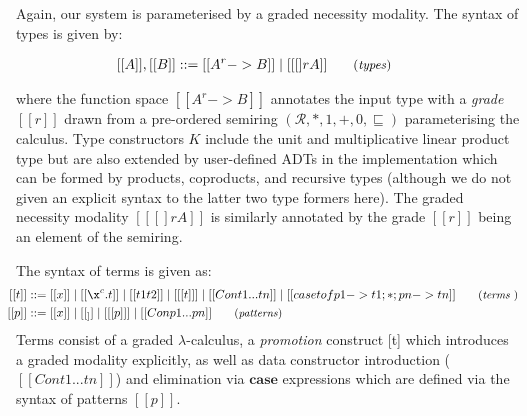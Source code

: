 Again, our system is parameterised by a graded necessity modality. The syntax of types is given by:

\begin{align*}
\hspace{-0.9em}[[ A ]] , [[ B ]] & ::=
       [[ A ^ r -> B ]]
  \mid [[ [] r A ]]
{\small{\tag{\textit{types}}}}
\end{align*}


where the function space $[[ A ^ r -> B ]]$ annotates the input type with a \emph{grade} $[[ r ]]$
drawn from a pre-ordered semiring $(\mathcal{R}, {\ast}, {1}, {+}, {0}, \sqsubseteq)$ parameterising
the calculus. Type constructors $K$ include the unit and multiplicative linear product type but
are also extended by user-defined ADTs in the implementation which can be formed by products, coproducts,
and recursive types (although we do not given an explicit syntax to the latter two type formers here).
The graded necessity modality $[[ [] r A ]]$ is similarly annotated by the grade $[[ r ]]$ being
an element of the semiring. %



The syntax of terms is given as:
%
\begin{align*}
\hspace{-0.8em} [[ t ]] ::= \;
       & [[ x ]]
  \mid [[ \x ^ c . t ]]
  \mid [[ t1 t2 ]]
  \mid [[ [t] ]]
  \mid [[ Con t1 ... tn ]]
  \mid [[ case t of p1 -> t1 ; * ; pn -> tn  ]]
{\small{\tag{\textit{terms} }}}
         \\
\hspace{-0.8em} [[ p ]] ::= \;
       & [[ x ]]
  \mid [[ _ ]]
  \mid [[ [p] ]]
  \mid [[ Con p1 ... pn ]]
{\small{\tag{\textit{patterns}}}}
\end{align*}
%
Terms consist of a graded $\lambda$-calculus, a \textit{promotion} construct [t] which introduces a graded modality explicitly, as well as data constructor introduction ($[[ Con t1 ... tn ]]$) and elimination via
 $\textbf{case}$ expressions which are defined via the syntax of patterns $[[ p ]]$.




